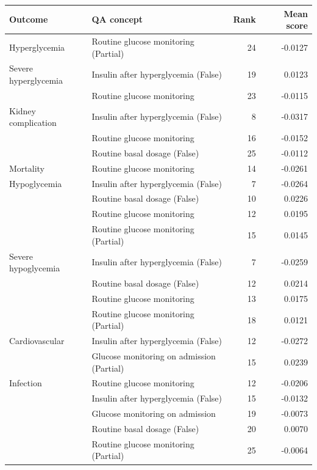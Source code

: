 \begin{tabular}{>{\raggedright\arraybackslash}p{3.2cm}>{\raggedright\arraybackslash}p{8.3cm}rr}
\toprule
Outcome & QA concept & Rank & Mean score \\
\midrule
Hyperglycemia & Routine glucose monitoring (Partial) & 24 & -0.0127 \\
\midrule
Severe hyperglycemia & Insulin after hyperglycemia (False) & 19 & 0.0123 \\
 & Routine glucose monitoring & 23 & -0.0115 \\
\midrule
Kidney complication & Insulin after hyperglycemia (False) & 8 & -0.0317 \\
 & Routine glucose monitoring & 16 & -0.0152 \\
 & Routine basal dosage (False) & 25 & -0.0112 \\
\midrule
Mortality & Routine glucose monitoring & 14 & -0.0261 \\
\midrule
Hypoglycemia & Insulin after hyperglycemia (False) & 7 & -0.0264 \\
 & Routine basal dosage (False) & 10 & 0.0226 \\
 & Routine glucose monitoring & 12 & 0.0195 \\
 & Routine glucose monitoring (Partial) & 15 & 0.0145 \\
\midrule
Severe hypoglycemia & Insulin after hyperglycemia (False) & 7 & -0.0259 \\
 & Routine basal dosage (False) & 12 & 0.0214 \\
 & Routine glucose monitoring & 13 & 0.0175 \\
 & Routine glucose monitoring (Partial) & 18 & 0.0121 \\
\midrule
Cardiovascular & Insulin after hyperglycemia (False) & 12 & -0.0272 \\
 & Glucose monitoring on admission (Partial) & 15 & 0.0239 \\
\midrule
Infection & Routine glucose monitoring & 12 & -0.0206 \\
 & Insulin after hyperglycemia (False) & 15 & -0.0132 \\
 & Glucose monitoring on admission & 19 & -0.0073 \\
 & Routine basal dosage (False) & 20 & 0.0070 \\
 & Routine glucose monitoring (Partial) & 25 & -0.0064 \\
\bottomrule
\end{tabular}
